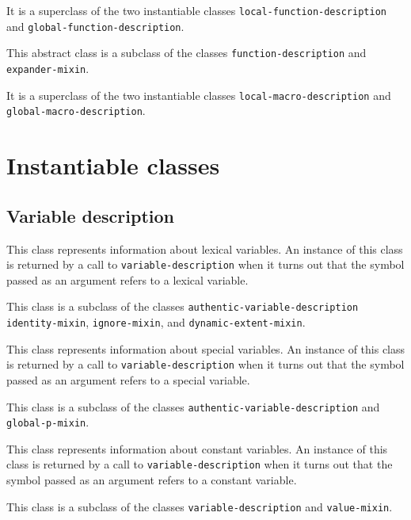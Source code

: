 It is a superclass of the two instantiable classes
\texttt{local-function-description} and
\texttt{global-function-description}.


This abstract class is a subclass of the classes
\texttt{function-description} and \texttt{expander-mixin}.

It is a superclass of the two instantiable classes
\texttt{local-macro-description} and
\texttt{global-macro-description}.

\section{Instantiable classes}

\subsection{Variable description}


This class represents information about lexical variables.  An
instance of this class is returned by a call to \texttt{variable-description}
when it turns out that the symbol passed as an argument refers to a
lexical variable.

This class is a subclass of the classes
\texttt{authentic-variable-description} \texttt{identity-mixin},
\texttt{ignore-mixin}, and \texttt{dynamic-extent-mixin}.


This class represents information about special variables.   An
instance of this class is returned by a call to \texttt{variable-description}
when it turns out that the symbol passed as an argument refers to a
special variable.

This class is a subclass of the classes
\texttt{authentic-variable-description} and \texttt{global-p-mixin}.


This class represents information about constant variables.   An
instance of this class is returned by a call to \texttt{variable-description}
when it turns out that the symbol passed as an argument refers to a
constant variable.

This class is a subclass of the classes \texttt{variable-description} and
\texttt{value-mixin}.


